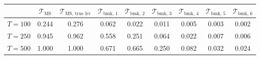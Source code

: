 % 
\begin{tabular}{ccccccccc}
  \hline
  & $\mathcal{T}_{\text{MS}}$ & $\mathcal{T}_{\text{MS, true lrv}}$ & $\mathcal{T}_{\text{bmk, }1}$ & $\mathcal{T}_{\text{bmk, }2}$ & $\mathcal{T}_{\text{bmk, }3}$ & $\mathcal{T}_{\text{bmk, }4}$ & $\mathcal{T}_{\text{bmk, }5}$ & $\mathcal{T}_{\text{bmk, }6}$\\
 \hline
$T = 100$ & 0.244 & 0.276 & 0.062 & 0.022 & 0.011 & 0.005 & 0.003 & 0.002 \\ 
  $T = 250$ & 0.945 & 0.962 & 0.558 & 0.251 & 0.064 & 0.022 & 0.007 & 0.006 \\ 
  $T = 500$ & 1.000 & 1.000 & 0.671 & 0.665 & 0.250 & 0.082 & 0.032 & 0.024 \\ 
   \hline
\end{tabular}
